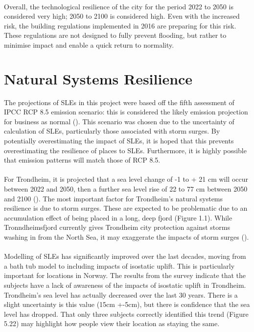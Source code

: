 \paragraph{}
Overall, the technological resilience of the city for the period 2022 to 2050 is considered very high; 2050 to 2100 is considered high. Even with the increased risk, the building regulations implemented in 2016 are preparing for this risk. These regulations are not designed to fully prevent flooding, but rather to minimise impact and enable a quick return to normality. 


\section{Natural Systems Resilience}
The projections of SLEs in this project were based off the fifth assessment of IPCC RCP 8.5 emission scenario: this is considered the likely emission projection for business as normal (\cite{hanssen-bauer_climate_2017}). This scenario was chosen due to the uncertainty of calculation of SLEs, particularly those associated with storm surges. By potentially overestimating the impact of SLEs, it is hoped that this prevents overestimating the resilience of places to SLEs. Furthermore, it is highly possible that emission patterns will match those of RCP 8.5. 
\paragraph{}

For Trondheim, it is projected that a sea level change of -1 to + 21 cm will occur between 2022 and 2050, then a further sea level rise of 22 to 77 cm between 2050 and 2100 (\cite{hanssen_saksframlegg_2013}). The most important factor for Trondheim's natural systems resilience is due to storm surges. These are expected to be problematic due to an accumulation effect of being placed in a long, deep fjord (Figure 1.1). While Tronndheimsfjord currently gives Trondheim city protection against storms washing in from the North Sea, it may exaggerate the impacts of storm surges (\cite{hanssen_saksframlegg_2013}). 
\paragraph{}
Modelling of SLEs has significantly improved over the last decades, moving from a bath tub model to including impacts of isostatic uplift. This is particularly important for locations in Norway. The results from the survey indicate that the subjects have a lack of awareness of the impacts of isostatic uplift in Trondheim. Trondheim's sea level has actually decreased over the last 30 years. There is a slight uncertainty is this value (15cm +-5cm), but there is confidence that the sea level has dropped. That only three subjects correctly identified this trend (Figure 5.22) may highlight how people view their location as staying the same.

